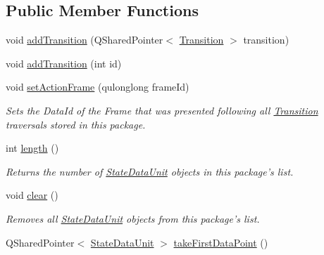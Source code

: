 \subsection*{Public Member Functions}
\begin{DoxyCompactItemize}
\item 
void \hyperlink{class_picto_1_1_state_data_unit_package_af569a41cce6b6bd83ae4dd55e1891f38}{add\-Transition} (Q\-Shared\-Pointer$<$ \hyperlink{class_picto_1_1_transition}{Transition} $>$ transition)
\item 
void \hyperlink{class_picto_1_1_state_data_unit_package_a64a8803a14b8a4f25972a1c36832b9e8}{add\-Transition} (int id)
\item 
\hypertarget{class_picto_1_1_state_data_unit_package_a287630ac357b6084d29b26c9411a4577}{void \hyperlink{class_picto_1_1_state_data_unit_package_a287630ac357b6084d29b26c9411a4577}{set\-Action\-Frame} (qulonglong frame\-Id)}\label{class_picto_1_1_state_data_unit_package_a287630ac357b6084d29b26c9411a4577}

\begin{DoxyCompactList}\small\item\em Sets the Data\-Id of the Frame that was presented following all \hyperlink{class_picto_1_1_transition}{Transition} traversals stored in this package. \end{DoxyCompactList}\item 
\hypertarget{class_picto_1_1_state_data_unit_package_aaa09389ccff661b8c40a3c5ec75923df}{int \hyperlink{class_picto_1_1_state_data_unit_package_aaa09389ccff661b8c40a3c5ec75923df}{length} ()}\label{class_picto_1_1_state_data_unit_package_aaa09389ccff661b8c40a3c5ec75923df}

\begin{DoxyCompactList}\small\item\em Returns the number of \hyperlink{class_picto_1_1_state_data_unit}{State\-Data\-Unit} objects in this package's list. \end{DoxyCompactList}\item 
\hypertarget{class_picto_1_1_state_data_unit_package_a04b0b6926106ffe6e77209421c732734}{void \hyperlink{class_picto_1_1_state_data_unit_package_a04b0b6926106ffe6e77209421c732734}{clear} ()}\label{class_picto_1_1_state_data_unit_package_a04b0b6926106ffe6e77209421c732734}

\begin{DoxyCompactList}\small\item\em Removes all \hyperlink{class_picto_1_1_state_data_unit}{State\-Data\-Unit} objects from this package's list. \end{DoxyCompactList}\item 
\hypertarget{class_picto_1_1_state_data_unit_package_a3715233ffa1753e27d8d338c70fda5b4}{Q\-Shared\-Pointer$<$ \hyperlink{class_picto_1_1_state_data_unit}{State\-Data\-Unit} $>$ \hyperlink{class_picto_1_1_state_data_unit_package_a3715233ffa1753e27d8d338c70fda5b4}{take\-First\-Data\-Point} ()}\label{class_picto_1_1_state_data_unit_package_a3715233ffa1753e27d8d338c70fda5b4}


\end{DoxyCompactItemize}
